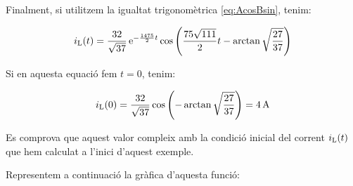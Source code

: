 \begin{exemple}
    Finalment, si utilitzem la igualtat trigonomètrica
    \eqref{eq:AcosBsin}, tenim:

    \[
    i_\mathrm{L}(t) = \frac{32}{\sqrt{37}}\,\mathrm{e}^{-\frac{1475}{2}t}
    \cos\left(\frac{75\sqrt{111}}{2} t - \arctan
    \sqrt{\frac{27}{37}}\right)
    \]

    Si en aquesta equació fem $t=0$, tenim:

    \[
        i_\mathrm{L}(0) = \frac{32}{\sqrt{37}} \cos\left( - \arctan
    \sqrt{\frac{27}{37}}\right) = \SI{4}{A}
    \]

    Es comprova que aquest valor compleix amb la condició inicial del
    corrent $i_\mathrm{L}(t)$ que hem calculat a l'inici d'aquest exemple.

    Representem a continuació la gràfica d'aquesta funció:

    \begin{center}
        
    \end{center}
\end{exemple}



